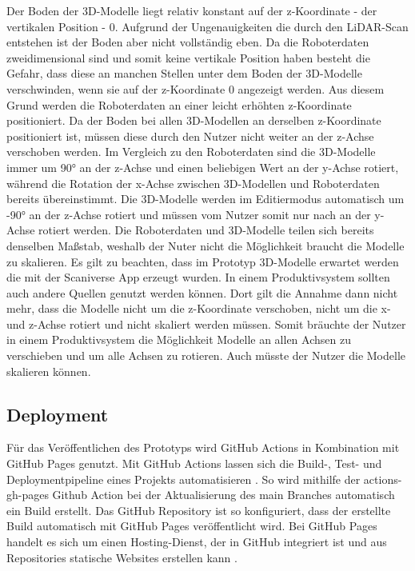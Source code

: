Der Boden der 3D-Modelle liegt relativ konstant auf der z-Koordinate - der vertikalen Position - 0. Aufgrund der Ungenauigkeiten die durch den \ac{LiDAR}-Scan entstehen ist der Boden aber nicht vollständig eben. Da die Roboterdaten zweidimensional sind und somit keine vertikale Position haben besteht die Gefahr, dass diese an manchen Stellen unter dem Boden der 3D-Modelle verschwinden, wenn sie auf der z-Koordinate 0 angezeigt werden. Aus diesem Grund werden die Roboterdaten an einer leicht erhöhten z-Koordinate positioniert. Da der Boden bei allen 3D-Modellen an derselben z-Koordinate positioniert ist, müssen diese durch den Nutzer nicht weiter an der z-Achse verschoben werden. Im Vergleich zu den Roboterdaten sind die 3D-Modelle immer um 90° an der z-Achse und einen beliebigen Wert an der y-Achse rotiert, während die Rotation der x-Achse zwischen 3D-Modellen und Roboterdaten bereits übereinstimmt. Die 3D-Modelle werden im Editiermodus automatisch um -90° an der z-Achse rotiert und müssen vom Nutzer somit nur nach an der y-Achse rotiert werden. Die Roboterdaten und 3D-Modelle teilen sich bereits denselben Maßstab, weshalb der Nuter nicht die Möglichkeit braucht die Modelle zu skalieren. Es gilt zu beachten, dass im Prototyp 3D-Modelle erwartet werden die mit der Scaniverse App erzeugt wurden. In einem Produktivsystem sollten auch andere Quellen genutzt werden können. Dort gilt die Annahme dann nicht mehr, dass die Modelle nicht um die z-Koordinate verschoben, nicht um die x- und z-Achse rotiert und nicht skaliert werden müssen. Somit bräuchte der Nutzer in einem Produktivsystem die Möglichkeit Modelle an allen Achsen zu verschieben und um alle Achsen zu rotieren. Auch müsste der Nutzer die Modelle skalieren können.

\subsection{Deployment}

Für das Veröffentlichen des Prototyps wird GitHub Actions in Kombination mit GitHub Pages genutzt. Mit GitHub Actions lassen sich die Build-, Test- und Deploymentpipeline eines Projekts automatisieren \cite{GitHubActions}. So wird mithilfe der actions-gh-pages Github Action 
bei der Aktualisierung des main Branches automatisch ein Build erstellt. Das GitHub Repository ist so konfiguriert, dass der erstellte Build automatisch mit GitHub Pages veröffentlicht wird. Bei GitHub Pages handelt es sich um einen Hosting-Dienst, der in GitHub integriert ist und aus Repositories statische Websites erstellen kann \cite{GitHubPages}.

